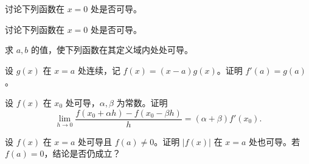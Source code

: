 \newpage
\noindent\begin{minipage}{\textwidth}
讨论下列函数在 $x=0$ 处是否可导。
\end{minipage}\par\vfill
\noindent\begin{minipage}{\textwidth}
讨论下列函数在 $x=0$ 处是否可导。
\end{minipage}\par\vfill
\noindent\begin{minipage}{\textwidth}
求 $a,b$ 的值，使下列函数在其定义域内处处可导。
\end{minipage}\par\vfill
\noindent\begin{minipage}{\textwidth}
设 $g(x)$ 在 $x=a$ 处连续，记 $f(x)=(x-a)g(x)$。证明 $f'(a)=g(a)$。
\end{minipage}\par\vfill
\newpage
\noindent\begin{minipage}{\textwidth}
设 $f(x)$ 在 $x_0$ 处可导，$\alpha,\beta$ 为常数。证明\[\lim_{h\to0}\frac{f(x_0+\alpha h)-f(x_0-\beta h)}h=(\alpha+\beta)f'(x_0).\]
\end{minipage}\par\vfill
\noindent\begin{minipage}{\textwidth}
设 $f(x)$ 在 $x=a$ 处可导且 $f(a)\ne0$。证明 $|f(x)|$ 在 $x=a$ 处也可导。若 $f(a)=0$，结论是否仍成立？
\end{minipage}\par\vfill
